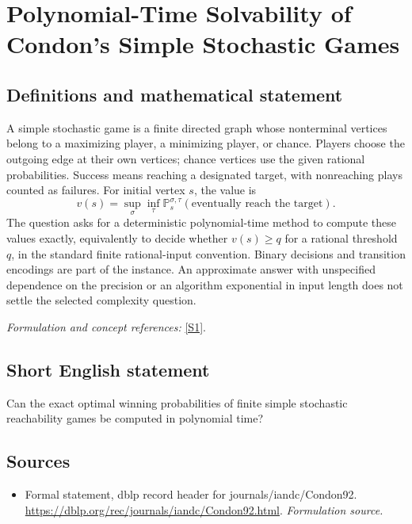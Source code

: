 \documentclass[11pt]{article}
\begin{document}
\section*{\texorpdfstring{Polynomial-Time Solvability of Condon's Simple Stochastic Games}{Polynomial-Time Solvability of Condon's Simple Stochastic Games}}\label{30006959}
\subsection{Definitions and mathematical statement}
A simple stochastic game is a finite directed graph whose nonterminal vertices belong to a maximizing player, a minimizing player, or chance. Players choose the outgoing edge at their own vertices; chance vertices use the given rational probabilities. Success means reaching a designated target, with nonreaching plays counted as failures. For initial vertex $s$, the value is
\[
 v(s)=\sup_\sigma\inf_\tau
 {\mathbb{P}}_s^{\sigma,\tau}(\text{eventually reach the target}).
\]
The question asks for a deterministic polynomial-time method to compute these values exactly, equivalently to decide whether $v(s)\ge q$ for a rational threshold $q$, in the standard finite rational-input convention. Binary decisions and transition encodings are part of the instance. An approximate answer with unspecified dependence on the precision or an algorithm exponential in input length does not settle the selected complexity question.
\par\smallskip\textit{Formulation and concept references:} \href{https://dblp.org/rec/journals/iandc/Condon92.html}{[S1]}.

\subsection{Short English statement}
Can the exact optimal winning probabilities of finite simple stochastic reachability games be computed in polynomial time?
\subsection{Sources}
\begin{itemize}
\item[S1]Formal statement, dblp record header for journals/iandc/Condon92.
\url{https://dblp.org/rec/journals/iandc/Condon92.html}.
\textit{Formulation source.}
\end{itemize}
\end{document}
